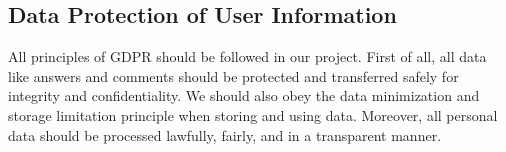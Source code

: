 \documentclass[a4paper]{article}
\begin{document}
    \vspace*{-1em}
    
    \subsection*{Data Protection of User Information}
    All principles of GDPR should be followed in our project.
    First of all, all data like answers and comments should be protected and transferred safely for integrity and confidentiality.
    We should also obey the data minimization and storage limitation principle when storing and using data.
    Moreover, all personal data should be processed lawfully, fairly, and in a transparent manner.
\end{document}
